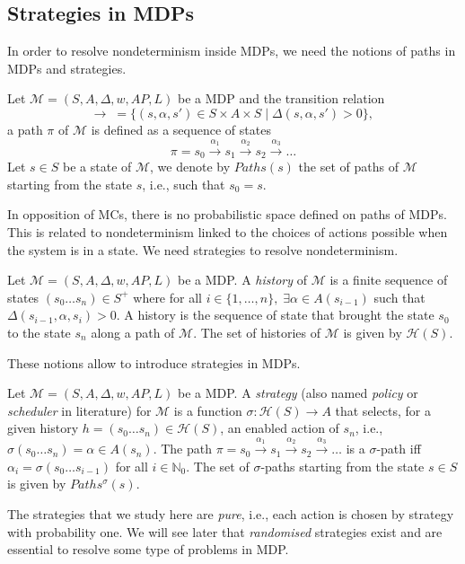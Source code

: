 \subsection{Strategies in MDPs}
In order to resolve nondeterminism inside MDPs, we need the notions of paths in MDPs and strategies.
\begin{definition}
  Let $\mathcal{M}=(S, A, \Delta, w, AP, L)$ be a MDP and the transition relation
  \[\rightarrow \; =  \{ (s, \alpha, s') \in S \times A \times S \; | \; \Delta(s, \alpha, s') > 0 \}, \,\]
	a path $\pi$ of $\mathcal{M}$ is defined as a sequence of states
	\[ \pi = s_0 \xrightarrow{\alpha_1} s_1 \xrightarrow{\alpha_2} s_2 \xrightarrow{\alpha_3} \dots \]
	Let $s \in S$ be a state of $\mathcal{M}$, we denote by $Paths(s)$ the set of
	paths of $\mathcal{M}$ starting from the state $s$, i.e., such that $s_0 = s$.
\end{definition}
In opposition of MCs, there is no probabilistic space defined on paths of MDPs.
This is related to nondeterminism linked to the choices of actions possible when the system is in a state. We need strategies to resolve nondeterminism.
\begin{definition}
	Let $\mathcal{M} = (S, A, \Delta, w, AP, L)$ be a MDP. A \textit{history} of $\mathcal{M}$
	is a finite sequence of states $(s_0 \dots s_n) \in S^+$ where for all
	$i \in \{1, \dots, n \}, \; \exists \alpha \in A(s_{i-1})$ such that $\Delta(s_{i-1}, \alpha, s_i) > 0$.
	A history is the sequence of state that brought the state $s_0$ to the state $s_n$ along a path of $\mathcal{M}$. The set of histories of $\mathcal{M}$  is given by $\mathcal{H}(S)$.
\end{definition}

These notions allow to introduce strategies in MDPs.

\begin{definition}
Let $\mathcal{M} = (S, A, \Delta, w, AP, L)$ be a MDP. A \textit{strategy} (also named \textit{policy} or \textit{scheduler} in literature) for $\mathcal{M}$
	is a function
	$\sigma: \mathcal{H}(S) \rightarrow A$
	that selects, for a given history $h = (s_0 \dots s_n) \in \mathcal{H}(S)$, an enabled action of $s_n$, i.e., $\sigma(s_0 \dots s_n) = \alpha \in A(s_n)$.
	The path $\pi = s_0 \xrightarrow{\alpha_1} s_1 \xrightarrow{\alpha_2} s_2 \xrightarrow{\alpha_3} \dots$
	is a $\sigma$-path iff $\alpha_i = \sigma(s_0 \dots s_{i-1})$
	for all $i \in \mathbb{N}_0$. The set of $\sigma$-paths starting from the state $s \in S$ is given by $Paths^\sigma(s)$.
\end{definition}
The strategies that we study here are \textit{pure}, i.e., each action is chosen by strategy with probability one. We will see later that \textit{randomised} strategies exist and are essential to resolve some type of problems in MDP. \\

